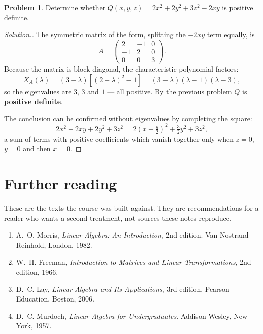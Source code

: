 \documentclass[11pt,a4paper]{article}
\theoremstyle{definition}
\newtheorem{problemx}{Problem}[section]
\newenvironment{problem}{\begin{problemx}}{\end{problemx}}
\newenvironment{solution}
  {\renewcommand{\qedsymbol}{}\begin{proof}[\textit{Solution}.]}
  {\end{proof}}
\begin{document}
\begin{problem}
Determine whether $Q(x,y,z)=2x^2+2y^2+3z^2-2xy$ is positive definite.
\end{problem}
\begin{solution}
The symmetric matrix of the form, splitting the $-2xy$ term equally, is
$$A=\begin{pmatrix}2&-1&0\\-1&2&0\\0&0&3\end{pmatrix}.$$
Because the matrix is block diagonal, the characteristic polynomial factors:
$$X_A(\lambda)=(3-\lambda)\left[(2-\lambda)^2-1\right]
=(3-\lambda)(\lambda-1)(\lambda-3),$$
so the eigenvalues are $3$, $3$ and $1$ --- all positive. By the previous
problem $Q$ is \textbf{positive definite}.

The conclusion can be confirmed without eigenvalues by completing the square:
$$2x^2-2xy+2y^2+3z^2=2\left(x-\tfrac{y}{2}\right)^2+\tfrac{3}{2}y^2+3z^2,$$
a sum of terms with positive coefficients which vanish together only when
$z=0$, $y=0$ and then $x=0$.
\end{solution}

\pagebreak

\section*{Further reading}
These are the texts the course was built against. They are recommendations for
a reader who wants a second treatment, not sources these notes reproduce.
\begin{enumerate}
\item A.~O. Morris, \emph{Linear Algebra: An Introduction}, 2nd edition. Van
      Nostrand Reinhold, London, 1982.
\item W.~H. Freeman, \emph{Introduction to Matrices and Linear
      Transformations}, 2nd edition, 1966.
\item D.~C. Lay, \emph{Linear Algebra and Its Applications}, 3rd edition.
      Pearson Education, Boston, 2006.
\item D.~C. Murdoch, \emph{Linear Algebra for Undergraduates}. Addison-Wesley,
      New York, 1957.
\end{enumerate}
\end{document}
